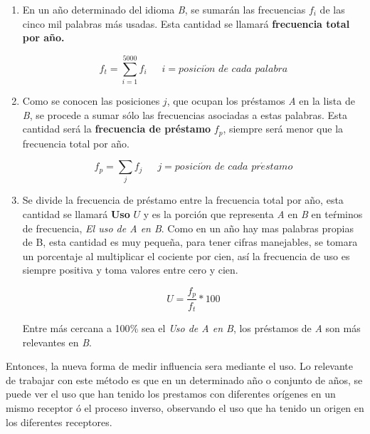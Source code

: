 \newpage

\begin{enumerate}
	
	\item En un año determinado del idioma \textit{B}, se sumarán las frecuencias $f_{i}$ de las cinco mil palabras más usadas.  Esta cantidad se llamará \textbf{frecuencia total por año.}
	
	\begin{equation}
	\label{ec.ftot}
	f_{t} = \sum_{i=1}^{5000} f_{i} \,\,\,\,\,\,\,\,\, i = posici\acute{o}n\,\, de \,\,cada \,\,palabra
	\end{equation}
	
	\item Como se conocen las posiciones $j$,  que ocupan los préstamos \textit{A} en la lista de \textit{B}, se procede a sumar sólo las frecuencias asociadas a estas palabras. Esta cantidad será la \textbf{frecuencia de préstamo} $f_{p}$,  siempre será menor que la frecuencia total por año.
	
	\begin{equation}
	\label{ec.fpres}
	f_{p} = \sum_{j} f_{j} \,\,\,\,\,\,\,\,\, j = posici\acute{o}n\,\, de \,\,cada \,\,pr\acute{e}stamo
	\end{equation}
	
	
	\item  Se divide la frecuencia de préstamo entre la frecuencia total por año, esta cantidad se llamará  \textbf{Uso} $U$ y es la porción que representa \textit{A} en \textit{B} en teŕminos de frecuencia, \textit{El uso de A en B}.  Como en un año hay mas palabras propias de B, esta cantidad es muy pequeña, para tener cifras manejables, se tomara un porcentaje al multiplicar el cociente por cien, así la frecuencia de uso es siempre positiva y toma valores entre cero y cien.  

	\begin{equation}
	\label{ec.fuso}
	 U = \frac{f_{p}}{f_{t}} * 100
	\end{equation}
	
	
	Entre más cercana a 100$\%$ sea el \textit{Uso de A en B}, los préstamos de \textit{A} son más relevantes en \textit{B}.

\end{enumerate}

Entonces,  la nueva forma de medir influencia sera mediante el uso. Lo relevante de trabajar con este método es que  en un determinado año o conjunto de años, se puede ver el uso que han tenido los prestamos con diferentes orígenes en un mismo receptor ó el proceso inverso,  observando el uso que ha tenido un origen en los diferentes receptores. 




